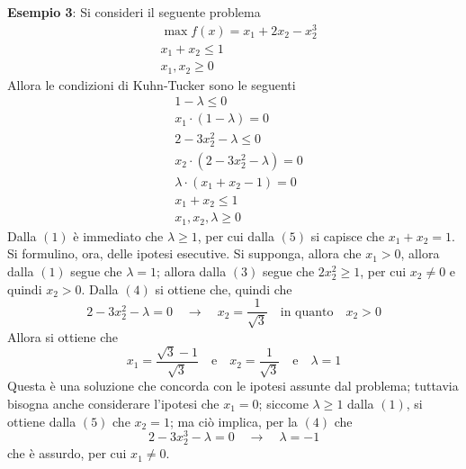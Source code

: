 \documentclass[a4paper]{extarticle}
\begin{document}
\vspace{2em}
\noindent
\textbf{Esempio 3}: Si consideri il seguente problema
\begin{align*}
    &\max f(x) = x_1+2x_2-x_2^3\\
    &x_1 + x_2 \leq 1\\
    &x_1, x_2 \geq 0
\end{align*}
Allora le condizioni di Kuhn-Tucker sono le seguenti
\begin{align}
    & 1 - \lambda \leq 0\\
    & x_1 \cdot (1-\lambda) = 0\\
    & 2 - 3x_2^2 - \lambda \leq 0\\
    & x_2 \cdot (2-3x_2^2-\lambda) =0\\
    & \lambda \cdot (x_1+x_2-1)=0\\
    & x_1 + x_2 \leq 1\\
    & x_1,x_2,\lambda \geq 0
\end{align}
Dalla $(1)$ è immediato che $\lambda \geq 1$, per cui dalla $(5)$ si capisce che $x_1+x_2 = 1$.\\
Si formulino, ora, delle ipotesi esecutive. Si supponga, allora che $x_1 > 0$, allora dalla $(1)$ segue che $\lambda=1$; allora dalla $(3)$ segue che $2x_2^2 \geq 1$, per cui $x_2 \neq 0$ e quindi $x_2 > 0$. Dalla $(4)$ si ottiene che, quindi che
\[2-3x_2^2 - \lambda = 0 \hspace{1em} \rightarrow \hspace{1em} x_2 = \dfrac{1}{\sqrt{3}} \hspace{1em} \text{in quanto} \hspace{1em} x_2 > 0\]
Allora si ottiene che
\[x_1 = \dfrac{\sqrt{3}-1}{\sqrt{3}} \hspace{1em} \text{e} \hspace{1em} x_2=\dfrac{1}{\sqrt{3}} \hspace{1em} \text{e} \hspace{1em} \lambda=1\]
Questa è una soluzione che concorda con le ipotesi assunte dal problema; tuttavia bisogna anche considerare l'ipotesi che $x_1=0$; siccome $\lambda \geq 1$ dalla $(1)$, si ottiene dalla $(5)$ che $x_2=1$; ma ciò implica, per la $(4)$ che
\[2-3x_2^3-\lambda=0 \hspace{1em} \rightarrow \hspace{1em} \lambda=-1\]
che è assurdo, per cui $x_1 \neq 0$.
\end{document}
